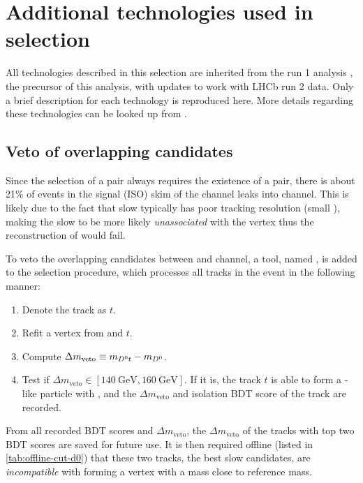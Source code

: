 \section{Additional technologies used in selection}
\label{ref:sel:algo}

All technologies described in this selection are inherited from the run 1 \RDX
analysis \cite{LHCb-ANA-2020-056},
the precursor of this analysis,
with updates to work with LHCb run 2 data.
Only a brief description for each technology is reproduced here.
More details regarding these technologies can be looked up from
\cite{LHCb-ANA-2020-056,LHCb-ANA-2014-052}.


\subsection{Veto of overlapping candidates}
\label{ref:sel:tech:veto}

Since the selection of a \Dstar\muon pair always requires the existence
of a \Dz\muon pair,
there is about 21\% of events in the signal (ISO) skim of the \Dstar channel
leaks into \Dz channel.
This is likely due to the fact that slow \pion typically has poor tracking
resolution (small \ipChiSq), making the slow \pion to be more likely
\emph{unassociated} with the \Dz\mun vertex thus the reconstruction of \Dstar
would fail.

To veto the overlapping candidates between \Dz and \Dstar channel,
a tool, named ,
is added to the selection procedure, which processes all tracks
in the event in the following manner:

\begin{enumerate}
    \item Denote the track as $t$.
    \item Refit a vertex from \Dz and $t$.
    \item Compute $\Delta m_\text{veto} \equiv m_{{{D}^0} t} - m_{{D}^0}$.
    \item Test if $\Delta m_\text{veto} \in [140~\text{GeV}, 160~\text{GeV}]$.
        If it is, the track $t$ is able to form a \Dstar-like particle with \Dz,
        and the $\Delta m_\text{veto}$ and isolation BDT score
        of the track are recorded.
\end{enumerate}

From all recorded BDT scores and $\Delta m_\text{veto}$, the
$\Delta m_\text{veto}$ of the tracks with top two BDT scores are saved
for future use.
It is then required offline (listed in \cref{tab:offline-cut-d0})
that these two tracks,
the best slow \pion candidates,
are \emph{incompatible} with
forming a \Dz\pion vertex with a mass close to \Dstar reference mass.

